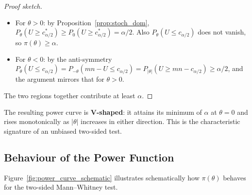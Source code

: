\documentclass[10pt]{article}
\begin{document}
\begin{proof}[Proof sketch]
\begin{itemize}
  \item For $\theta > 0$: by Proposition~\ref{prop:stoch_dom},
        $P_\theta(U \geq c^*_{\alpha/2}) \geq P_0(U \geq c^*_{\alpha/2})
        = \alpha/2$. Also $P_\theta(U \leq c_{\alpha/2})$ does not
        vanish, so $\pi(\theta) \geq \alpha$.
  \item For $\theta < 0$: by the anti-symmetry
        $P_\theta(U \leq c_{\alpha/2}) = P_{-\theta}(mn - U \leq c_{\alpha/2})
        = P_{|\theta|}(U \geq mn - c_{\alpha/2}) \geq \alpha/2$,
        and the argument mirrors that for $\theta > 0$.
\end{itemize}
The two regions together contribute at least $\alpha$. \qedhere
\end{proof}

The resulting power curve is \textbf{V-shaped}: it attains its
minimum of $\alpha$ at $\theta = 0$ and rises monotonically as
$|\theta|$ increases in either direction. This is the characteristic
signature of an unbiased two-sided test.

\subsection{Behaviour of the Power Function}

Figure~\ref{fig:power_curve_schematic} illustrates schematically how
$\pi(\theta)$ behaves for the two-sided Mann--Whitney test.
\end{document}
